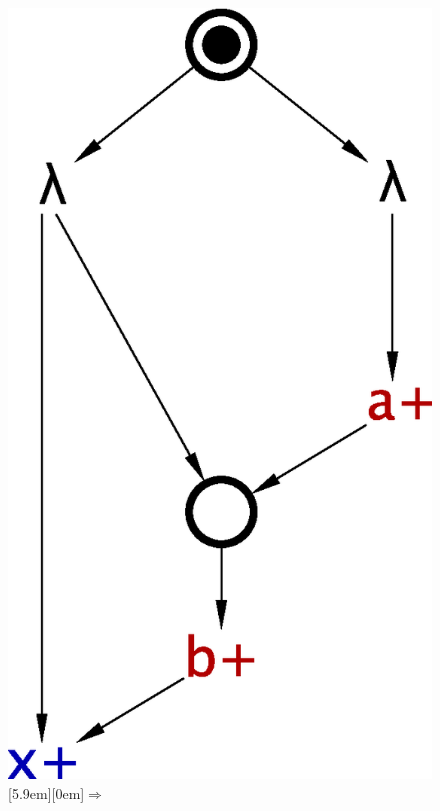 \begin{figure}[!tb]
    \centering
    {}%
    \hfill%
    \includegraphics[scale=0.3]{EXPERIMENTS/stg/dummy_counterexample}%
    \hfill%
    \raisebox{5.9em}[5.9em][0em]{\Large$\Rightarrow$}
    \hfill%

\end{figure}
